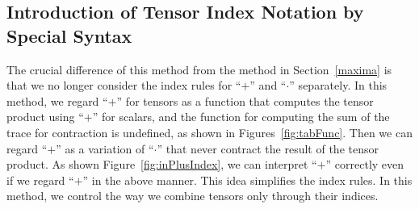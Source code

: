\documentclass[acmlarge]{acmart}
\begin{document}

\subsection{Introduction of Tensor Index Notation by Special Syntax}\label{wolfram}

The crucial difference of this method from the method in Section~\ref{maxima} is that we no longer consider the index rules for ``$+$'' and ``$\cdot$'' separately.
In this method, we regard ``$+$'' for tensors as a function that computes the tensor product using ``$+$'' for scalars, and the function for computing the sum of the trace for contraction is undefined, as shown in Figures~\ref{fig:tabFunc}.
Then we can regard ``$+$'' as a variation of ``$\cdot$'' that never contract the result of the tensor product. %
As shown Figure~\ref{fig:inPlusIndex}, we can interpret ``$+$'' correctly even if we regard ``$+$'' in the above manner.
This idea simplifies the index rules.
In this method, we control the way we combine tensors only through their indices.
\end{document}
